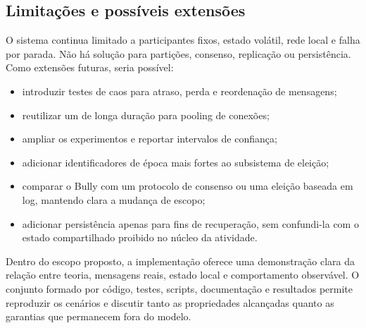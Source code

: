 \subsection{Limitações e possíveis extensões}

O sistema continua limitado a participantes fixos, estado volátil, rede local e falha por parada. Não há solução para partições, consenso, replicação ou persistência. Como extensões futuras, seria possível:

\begin{itemize}
    \item introduzir testes de caos para atraso, perda e reordenação de mensagens;
    \item reutilizar um  de longa duração para pooling de conexões;
    \item ampliar os experimentos e reportar intervalos de confiança;
    \item adicionar identificadores de época mais fortes ao subsistema de eleição;
    \item comparar o Bully com um protocolo de consenso ou uma eleição baseada em log, mantendo clara a mudança de escopo;
    \item adicionar persistência apenas para fins de recuperação, sem confundi-la com o estado compartilhado proibido no núcleo da atividade.
\end{itemize}

Dentro do escopo proposto, a implementação oferece uma demonstração clara da relação entre teoria, mensagens reais, estado local e comportamento observável. O conjunto formado por código, testes, scripts, documentação e resultados permite reproduzir os cenários e discutir tanto as propriedades alcançadas quanto as garantias que permanecem fora do modelo.

